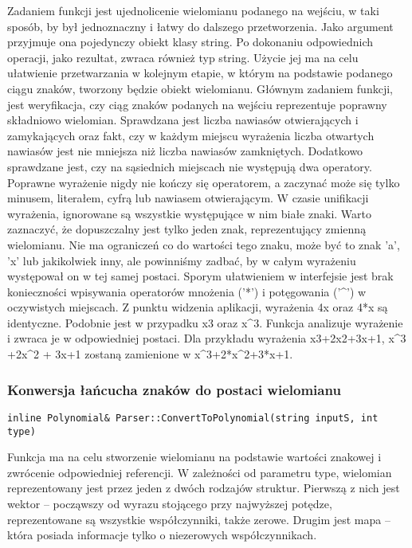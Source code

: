 \documentclass[twoside,a4paper]{book}
\begin{document}
Zadaniem funkcji jest ujednolicenie wielomianu podanego na wejściu, w taki sposób, by był jednoznaczny i łatwy do dalszego przetworzenia. Jako argument przyjmuje ona pojedynczy obiekt klasy string. Po dokonaniu odpowiednich operacji, jako rezultat, zwraca również typ string. Użycie jej ma na celu ułatwienie przetwarzania w kolejnym etapie, w którym na podstawie podanego ciągu znaków, tworzony będzie obiekt wielomianu. Głównym zadaniem funkcji, jest weryfikacja, czy ciąg znaków podanych na wejściu reprezentuje poprawny składniowo wielomian. Sprawdzana jest liczba nawiasów otwierających i zamykających oraz fakt, czy w każdym miejscu wyrażenia liczba otwartych nawiasów jest nie mniejsza niż liczba nawiasów zamkniętych. Dodatkowo sprawdzane jest, czy na sąsiednich miejscach nie występują dwa operatory. Poprawne wyrażenie nigdy nie kończy się operatorem, a zaczynać może się tylko minusem, literałem, cyfrą lub nawiasem otwierającym. W czasie unifikacji wyrażenia, ignorowane są wszystkie występujące w nim białe znaki. Warto zaznaczyć, że dopuszczalny jest tylko jeden znak, reprezentujący zmienną wielomianu. Nie ma ograniczeń co do wartości tego znaku, może być to znak 'a', 'x' lub jakikolwiek inny, ale powinniśmy zadbać, by w całym wyrażeniu występował on w tej samej postaci. Sporym ułatwieniem w interfejsie jest brak konieczności wpisywania operatorów mnożenia ('*') i potęgowania ('\^{}') w oczywistych miejscach. Z punktu widzenia aplikacji, wyrażenia 4x oraz 4*x są identyczne. Podobnie jest w przypadku x3 oraz x\^{}3. Funkcja analizuje wyrażenie i zwraca je w odpowiedniej postaci. Dla przykładu wyrażenia x3+2x2+3x+1, x\^{}3 +2x\^{}2 + 3x+1 zostaną zamienione w x\^{}3+2*x\^{}2+3*x+1.
\\

\subsubsection{Konwersja łańcucha znaków do postaci wielomianu}
\begin{lstlisting}
inline Polynomial& Parser::ConvertToPolynomial(string inputS, int type)
\end{lstlisting}

Funkcja ma na celu stworzenie wielomianu na podstawie wartości znakowej i zwrócenie odpowiedniej referencji. W zależności od parametru type, wielomian reprezentowany jest przez jeden z dwóch rodzajów struktur. Pierwszą z nich jest wektor -- począwszy od wyrazu stojącego przy najwyższej potędze, reprezentowane są wszystkie współczynniki, także zerowe. Drugim jest mapa -- która posiada informacje tylko o niezerowych współczynnikach.
\end{document}
